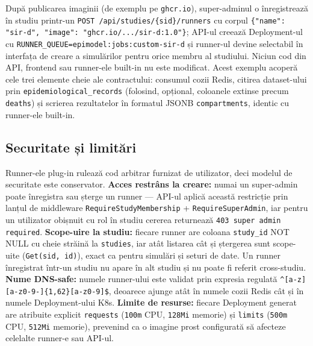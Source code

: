 După publicarea imaginii (de exemplu pe \texttt{ghcr.io}), super-adminul o
înregistrează în studiu printr-un \texttt{POST /api/studies/\{sid\}/runners}
cu corpul \texttt{\{"name": "sir-d", "image": "ghcr.io/.../sir-d:1.0"\}};
API-ul creează Deployment-ul cu \texttt{RUNNER\_QUEUE=epimodel:jobs:custom-sir-d}
și runner-ul devine selectabil în interfața de creare a simulărilor pentru
orice membru al studiului. Niciun cod din API, frontend sau runner-ele
built-in nu este modificat. Acest exemplu acoperă cele trei elemente cheie
ale contractului: consumul cozii Redis, citirea dataset-ului prin
\texttt{epidemiological\_records} (folosind, opțional, coloanele extinse
precum \texttt{deaths}) și scrierea rezultatelor în formatul JSONB
\texttt{compartments}, identic cu runner-ele built-in.

\subsection{Securitate și limitări}
\label{subsec:plugin_securitate}

Runner-ele plug-in rulează cod arbitrar furnizat de utilizator, deci modelul
de securitate este conservator. \textbf{Acces restrâns la creare:} numai un
super-admin poate înregistra sau șterge un runner --- API-ul aplică această
restricție prin lanțul de middleware \texttt{RequireStudyMembership} +
\texttt{RequireSuperAdmin}, iar pentru un utilizator obișnuit cu rol în
studiu cererea returnează \texttt{403 super admin required}.
\textbf{Scope-uire la studiu:} fiecare runner are coloana \texttt{study\_id}
NOT NULL cu cheie străină la \texttt{studies}, iar atât listarea cât și
ștergerea sunt scope-uite (\texttt{Get(sid, id)}), exact ca pentru
simulări și seturi de date. Un runner înregistrat într-un studiu nu apare
în alt studiu și nu poate fi referit cross-studiu.
\textbf{Nume DNS-safe:} numele runner-ului este validat prin expresia
regulată \texttt{\textasciicircum[a-z][a-z0-9-]\{1,62\}[a-z0-9]\$}, deoarece
ajunge atât în numele cozii Redis cât și în numele Deployment-ului K8s.
\textbf{Limite de resurse:} fiecare Deployment generat are atribuite
explicit \texttt{requests} (\texttt{100m} CPU, \texttt{128Mi} memorie) și
\texttt{limits} (\texttt{500m} CPU, \texttt{512Mi} memorie), prevenind ca o
imagine prost configurată să afecteze celelalte runner-e sau API-ul.

